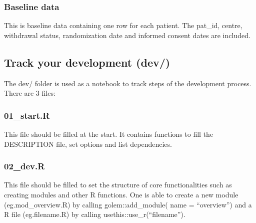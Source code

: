 \documentclass[]{article}
\newenvironment{Shaded}{\begin{snugshade}}{\end{snugshade}}
\newcommand{\CommentTok}[1]{\textcolor[rgb]{0.56,0.35,0.01}{\textit{#1}}}
\newcommand{\KeywordTok}[1]{\textcolor[rgb]{0.13,0.29,0.53}{\textbf{#1}}}
\newcommand{\NormalTok}[1]{#1}
\begin{document}
\hypertarget{baseline-data}{%
\subsubsection{Baseline data}\label{baseline-data}}

This is baseline data containing one row for each patient. The pat\_id,
centre, withdrawal status, randomization date and informed consent dates
are included.

\begin{Shaded}
\end{Shaded}

\hypertarget{track-your-development-dev}{%
\subsection{\texorpdfstring{\textbf{Track your development}
(dev/)}{Track your development (dev/)}}\label{track-your-development-dev}}

The dev/ folder is used as a notebook to track steps of the development
process. There are 3 files:

\hypertarget{start.r}{%
\subsubsection{01\_start.R}\label{start.r}}

This file should be filled at the start. It contains functions to fill
the DESCRIPTION file, set options and list dependencies.

\hypertarget{dev.r}{%
\subsubsection{02\_dev.R}\label{dev.r}}

This file should be filled to set the structure of core functionalities
such as creating modules and other R functions. One is able to create a
new module (eg.mod\_overview.R) by calling golem::add\_module( name =
``overview'') and a R file (eg.filename.R) by calling
usethis::use\_r(``filename'').
\end{document}
